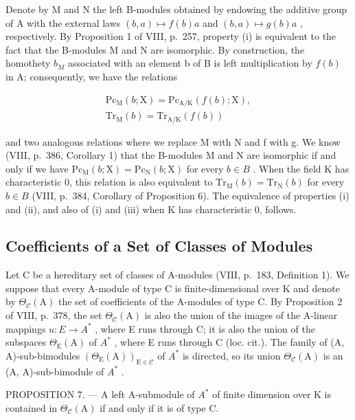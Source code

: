 Denote by M and N the left B-modules obtained by endowing the additive group of A with the external laws \((b,a)\mapsto f(b)a\) and \((b,a)\mapsto g(b)a\) , respectively. By Proposition 1 of VIII, p.~257, property (i) is equivalent to the fact that the B-modules M and N are isomorphic. By construction, the homothety \(b_{M}\) associated with an element b of B is left multiplication by \(f(b)\) in A; consequently, we have the relations

\[
\begin{array}{c} \mathrm {Pc_ {M}} (b; \mathrm{X}) = \mathrm {Pc_ {A / K}} (f (b); \mathrm{X}), \\ \mathrm{Tr} _ {\mathrm{M}} (b) = \mathrm{Tr} _ {\mathrm{A/K}} (f (b)) \end{array}
\]

and two analogous relations where we replace M with N and f with g. We know (VIII, p.~386, Corollary 1) that the B-modules M and N are isomorphic if and only if we have \(\mathrm{Pc}_{\mathrm{M}}(b;\mathrm{X})=\mathrm{Pc}_{\mathrm{N}}(b;\mathrm{X})\) for every \(b\in B\) . When the field K has characteristic 0, this relation is also equivalent to \(\mathrm{Tr}_{\mathrm{M}}(b)=\mathrm{Tr}_{\mathrm{N}}(b)\) for every \(b\in B\) (VIII, p.~384, Corollary of Proposition 6). The equivalence of properties (i) and (ii), and also of (i) and (iii) when K has characteristic 0, follows.

\subsection{Coefficients of a Set of Classes of Modules}

Let C be a hereditary set of classes of A-modules (VIII, p.~183, Definition 1). We suppose that every A-module of type C is finite-dimensional over K and denote by \(\Theta_{\mathcal{C}}(\mathrm{A})\) the set of coefficients of the A-modules of type C. By Proposition 2 of VIII, p.~378, the set \(\Theta_{\mathcal{C}}(\mathrm{A})\) is also the union of the images of the A-linear mappings \(u: E \to A^{*}\) , where E runs through C; it is also the union of the subspaces \(\Theta_{\mathrm{E}}(\mathrm{A})\) of \(A^{*}\) , where E runs through C (loc. cit.). The family of (A, A)-sub-bimodules \((\Theta_{\mathrm{E}}(\mathrm{A}))_{\mathrm{E} \in \mathcal{C}}\) of \(A^{*}\) is directed, so its union \(\Theta_{\mathcal{C}}(\mathrm{A})\) is an (A, A)-sub-bimodule of \(A^{*}\) .

PROPOSITION 7. --- A left A-submodule of \(A^{*}\) of finite dimension over K is contained in \(\Theta_{\mathcal{C}}(\mathrm{A})\) if and only if it is of type C.

